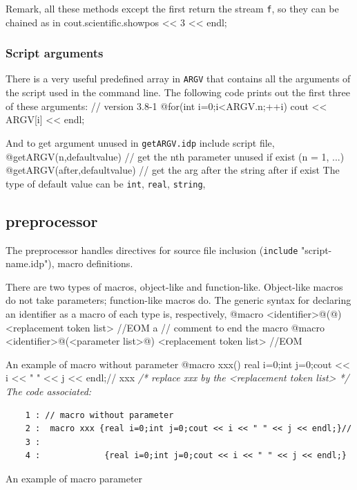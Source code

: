 \documentclass[a4paper,twoside,12pt]{book}
\def\setS#1{#1\label{sec:#1}}
\begin{document}
\begin{example}
Remark, all these methods except the first return the stream \texttt{f}, so they can be chained as in
\bFF
    cout.scientific.showpos << 3 << endl;
\eFF

\subsubsection{\setS{Script arguments}}
There is a very useful predefined array in \freefempp \texttt{ARGV} that contains all the arguments of the script used in the command line. The following code prints out the first three of these arguments: 
\bFF
//  version 3.8-1
@for(int i=0;i<ARGV.n;++i)
  {
    cout << ARGV[i] << endl;
  }
\eFF
\end{example}



And to get argument unused in \texttt{getARGV.idp} include script file, 
\bFF
@getARGV(n,defaultvalue) // get the nth parameter  unused if exist (n = 1, ...)
@getARGV(after,defaultvalue) // get the arg after the string after if exist
\eFF
The type of default value can be \texttt{int}, \texttt{real}, \texttt{string},
\subsection{preprocessor}
The preprocessor handles directives for source file inclusion (\texttt{include} "script-name.idp"), macro definitions.

There are two types of macros, object-like and function-like. Object-like macros do not take parameters; function-like macros do. The generic syntax for declaring an identifier as a macro of each type is, respectively,
\bFF
@macro <identifier>@(@)  <replacement token list>  //EOM  a // comment  to end the macro
@macro <identifier>@(<parameter list>@) <replacement token list> //EOM 
\eFF

An example of macro without parameter 
\bFF
@macro xxx() {real i=0;int j=0;cout << i << " " << j << endl;}//
xxx \it/* replace xxx by the <replacement token list> */
\eFF
 The \freefempp code associated: 
\begin{verbatim}
    1 : // macro without parameter 
    2 :  macro xxx {real i=0;int j=0;cout << i << " " << j << endl;}//
    3 : 
    4 :             {real i=0;int j=0;cout << i << " " << j << endl;}
\end{verbatim}

An example of macro parameter 
\end{document}
